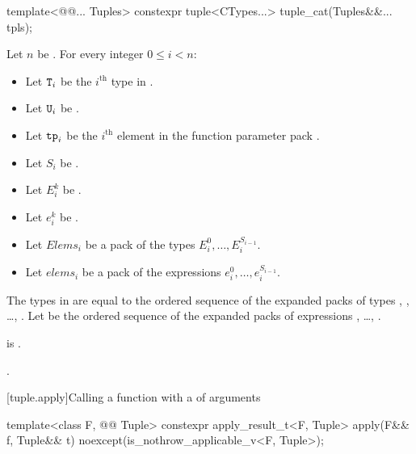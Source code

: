 \begin{itemdecl}
template<@@... Tuples>
  constexpr tuple<CTypes...> tuple_cat(Tuples&&... tpls);
\end{itemdecl}

\begin{itemdescr}
\pnum
Let $n$ be .
For every integer $0 \leq i < n$:
\begin{itemize}
\item
Let $\tcode{T}_i$ be the $i^\text{th}$ type in .
\item
Let $\tcode{U}_i$ be .
\item
Let $\tcode{tp}_i$ be the $i^\text{th}$ element
in the function parameter pack .
\item
Let $S_i$ be .
\item
Let $E_i^k$ be .
\item
Let $e_i^k$ be .
\item
Let $Elems_i$ be a pack of the types $E_i^0, \dotsc, E_i^{S_{i-1}}$.
\item
Let $elems_i$ be a pack of the expressions $e_i^0, \dotsc, e_i^{S_{i-1}}$.
\end{itemize}
The types in  are equal to the ordered sequence of
the expanded packs of types
, , \ldots, .
Let  be the ordered sequence of
the expanded packs of expressions
, \ldots, .

\pnum
\mandates
{} is .

\pnum
\returns
{}.
\end{itemdescr}

[tuple.apply]{Calling a function with a  of arguments}

%
\begin{itemdecl}
template<class F, @@ Tuple>
  constexpr apply_result_t<F, Tuple> apply(F&& f, Tuple&& t)
    noexcept(is_nothrow_applicable_v<F, Tuple>);
\end{itemdecl}

